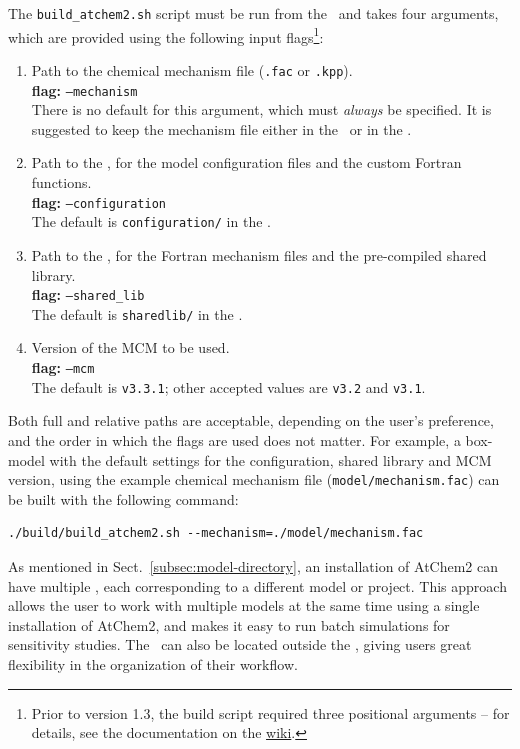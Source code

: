 The \texttt{build\_atchem2.sh} script must be run from the \maindir\ and takes four arguments,
which are provided using the following input flags\footnote{Prior to version 1.3, the build
  script required three positional arguments -- for details, see the documentation on the
  \href{https://github.com/AtChem/AtChem2/wiki/How-to-build-AtChem2}{wiki}.}:

\begin{enumerate}
\item Path to the chemical mechanism file (\texttt{.fac} or \texttt{.kpp}).\\
  \textbf{flag:} \texttt{--mechanism}\\
  There is no default for this argument, which must \emph{always} be specified. It is suggested
  to keep the mechanism file either in the \modeldir\ or in the \configdir.
\item Path to the \configdir, for the model configuration files and the custom Fortran functions.\\
  \textbf{flag:} \texttt{--configuration}\\
  The default is \texttt{configuration/} in the \modeldir.
\item Path to the \sharedir, for the Fortran mechanism files and the pre-compiled shared library.\\
  \textbf{flag:} \texttt{--shared\_lib}\\
  The default is \texttt{sharedlib/} in the \modeldir.
\item Version of the MCM to be used.\\
  \textbf{flag:} \texttt{--mcm}\\
  The default is \texttt{v3.3.1}; other accepted values are \texttt{v3.2} and \texttt{v3.1}.
\end{enumerate}

Both full and relative paths are acceptable, depending on the user's preference, and the order
in which the flags are used does not matter. For example, a box-model with the default settings
for the configuration, shared library and MCM version, using the example chemical mechanism
file (\texttt{model/mechanism.fac}) can be built with the following command:

\begin{Verbatim}[fontsize=\small]
  ./build/build_atchem2.sh --mechanism=./model/mechanism.fac
\end{Verbatim}

As mentioned in Sect.~\ref{subsec:model-directory}, an installation of AtChem2 can have
multiple \modeldir, each corresponding to a different model or project. This approach allows
the user to work with multiple models at the same time using a single installation of AtChem2,
and makes it easy to run batch simulations for sensitivity studies. The \modeldir\ can also be
located outside the \maindir, giving users great flexibility in the organization of their
workflow.

